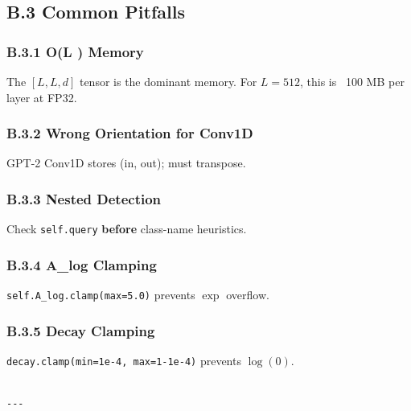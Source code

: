 \subsection{B.3 Common Pitfalls}

\subsubsection{B.3.1 O(L ) Memory}

The $[L, L, d]$ tensor is the dominant memory. For $L = 512$, this is 
~100 MB per layer at FP32.

\subsubsection{B.3.2 Wrong Orientation for Conv1D}

GPT-2 Conv1D stores (in, out); must transpose.

\subsubsection{B.3.3 Nested Detection}

Check \texttt{self.query} \textbf{before} class-name heuristics.

\subsubsection{B.3.4 A\_log Clamping}

\texttt{self.A\_log.clamp(max=5.0)} prevents $\exp$ overflow.

\subsubsection{B.3.5 Decay Clamping}

\texttt{decay.clamp(min=1e-4, max=1-1e-4)} prevents $\log(0)$.
\begin{lstlisting}

---
\end{lstlisting}
